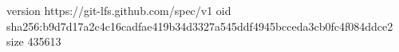version https://git-lfs.github.com/spec/v1
oid sha256:b9d7d17a2c4c16cadfae419b34d3327a545ddf4945bcceda3cb0fc4f084ddce2
size 435613
